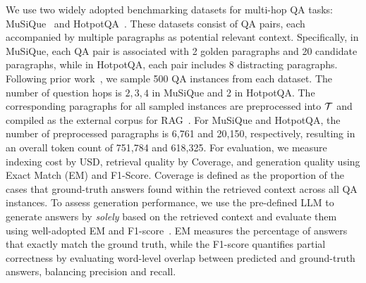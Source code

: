We use two widely adopted benchmarking datasets for multi-hop QA tasks: MuSiQue~\cite{trivedi2022musique} and HotpotQA~\cite{yang2018hotpotqa}. These datasets consist of QA pairs, each accompanied by multiple paragraphs as potential relevant context. Specifically, in MuSiQue, each QA pair is associated with 2 golden paragraphs and 20 candidate paragraphs, while in HotpotQA, each pair includes 8 distracting paragraphs.
Following prior work~\cite{wang2024knowledge, gutierrez2024hipporag}, we sample 500 QA instances from each dataset. The number of question hops is ${2,3,4}$ in MuSiQue and 2 in HotpotQA. The corresponding paragraphs for all sampled instances are preprocessed into $\mathcal{T}$ and compiled as the external corpus for RAG~\cite{gutierrez2024hipporag}.
For MuSiQue and HotpotQA, the number of preprocessed paragraphs is 6,761 and 20,150, respectively, resulting in an overall token count of 751,784 and 618,325.
For evaluation, we measure indexing cost by USD, retrieval quality by Coverage, and generation quality using Exact Match (EM) and F1-Score. Coverage is defined as the proportion of the cases that ground-truth answers found within the retrieved context across all QA instances.
To assess generation performance, we use the pre-defined LLM to generate answers by \textit{solely} based on the retrieved context and evaluate them using well-adopted EM and F1-score~\cite{gutierrez2024hipporag,wang2024knowledge,li2024graph}. EM measures the percentage of answers that exactly match the ground truth, while the F1-score quantifies partial correctness by evaluating word-level overlap between predicted and ground-truth answers, balancing precision and recall.

